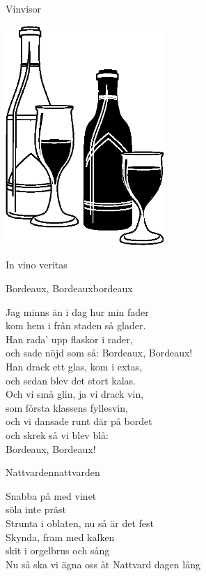 \begin{flushleft}
{\Huge Vinvisor\\}
\end{flushleft}

\vspace{2cm}
\begin{center}
\includegraphics[width=6cm]{bilder/63.eps}

{\Large
\vspace{1cm}
In vino veritas}
\end{center}

\newpage
\begin{song}{Bordeaux, Bordeaux}{bordeaux}
\begin{vers}
Jag minns än i dag hur min fader\\
kom hem i från staden så glader.\\
Han rada' upp flaskor i rader,\\
och sade nöjd som så: Bordeaux, Bordeaux!\\
Han drack ett glas, kom i extas,\\
och sedan blev det stort kalas.\\
Och vi små glin, ja vi drack vin,\\
som första klassens fyllesvin,\\
och vi dansade runt där på bordet\\
och skrek så vi blev blå:\\
Bordeaux, Bordeaux!\\
\end{vers}
\end{song}

\begin{song}{Nattvarden}{nattvarden}

\begin{vers}
Snabba på med vinet\\
söla inte präst\\
Strunta i oblaten, nu så är det fest\\
Skynda, fram med kalken\\
skit i orgelbrus och sång\\
Nu så ska vi ägna oss åt Nattvard dagen lång\\ 
\end{vers}
\end{song}


